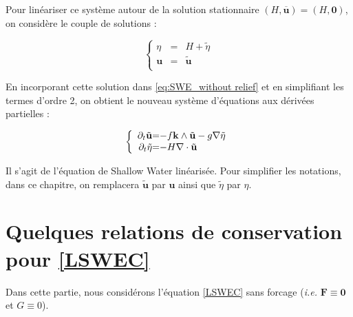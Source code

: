Pour linéariser ce système autour de la solution stationnaire $(H, \overline{\mathbf{u}}) = (H,\mathbf{0})$, on considère le couple de solutions :

\begin{equation}
\left\lbrace
\begin{array}{rcl}
\eta & = & H + \tilde{\eta} \\
\mathbf{u} & = & \tilde{\mathbf{u}} \\
\end{array}
\right.
\end{equation}

En incorporant cette solution dans \eqref{eq:SWE_without relief} et en simplifiant les termes d'ordre 2, on obtient le nouveau système d'équations aux dérivées partielles :

\begin{equation}
\left\lbrace
\begin{array}{r @{=} l}
\partial_t \tilde{\mathbf{u}}& -f \mathbf{k} \wedge \tilde{\mathbf{u}} - g \nabla \tilde{\eta}\\
\partial_t \tilde{\eta} & -H \nabla \cdot \tilde{\mathbf{u}}
\end{array}
\right.
\end{equation}

Il s'agit de l'équation de Shallow Water linéarisée.
Pour simplifier les notations, dans ce chapitre, on remplacera $\tilde{\mathbf{u}}$ par $\mathbf{u}$ ainsi que $\tilde{\eta}$ par $\eta$.





\section{Quelques relations de conservation pour \eqref{LSWEC}}

Dans cette partie, nous considérons l'équation \eqref{LSWEC} sans forcage (\textit{i.e.} $\mathbf{F} \equiv \mathbf{0}$ et $G \equiv 0$).

